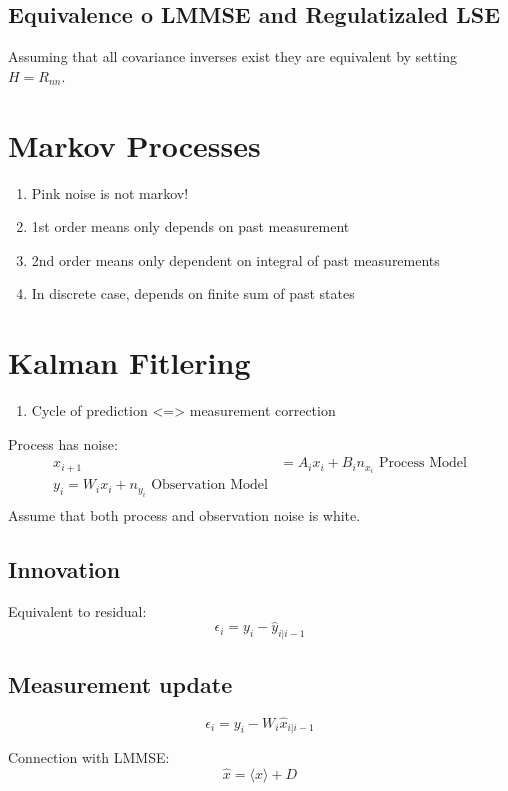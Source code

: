 \documentclass{homework}
\begin{document}
\subsection{Equivalence o LMMSE and Regulatizaled LSE}
Assuming that all covariance inverses exist they are equivalent by setting
$H = R_{nn}$.

\section{Markov Processes}
\begin{enumerate}
    \item Pink noise is not markov!
    \item 1st order means only depends on past measurement
    \item 2nd order means only dependent on integral of past measurements
    \item In discrete case, depends on finite sum of past states
\end{enumerate}

\section{Kalman Fitlering}
\begin{enumerate}
    \item Cycle of prediction <=> measurement correction
\end{enumerate}
Process has noise:
\begin{align*}
    x_{i+1} &= A_i x_i + B_i n_{x_i} \text{ Process Model}\\
    y_i = W_i x_i + n_{y_i} \text{ Observation Model} \\
\end{align*}
Assume that both process and observation noise is white.

\subsection{Innovation}
Equivalent to residual:
\begin{equation*}
    \epsilon_i = y_i - \hat{y}_{i|i-1} 
\end{equation*}

\subsection{Measurement update}
\begin{equation*}
    \epsilon_i = y_i - W_i \hat{x}_{i|i-1}
\end{equation*}

Connection with LMMSE:
\begin{equation*}
    \hat{x} = \langle x\rangle + D
\end{equation*}
\end{document}
